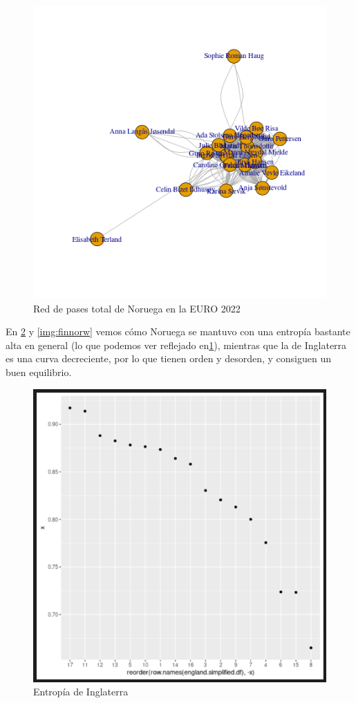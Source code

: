 \begin{figure}[h!tbp]
    \centering
     \includegraphics[width=\textwidth]{./img/plot_norw.png}
     \caption{Red de pases total de Noruega en la EURO 2022}
     \label{img:ent:norw}
\end{figure}

En \ref{img:fineng} y \ref{img:finnorw} vemos cómo Noruega se mantuvo con una entropía bastante alta en general
(lo que podemos ver reflejado en\ref{img:ent:norw}), 
mientras que la de Inglaterra es una curva decreciente, por lo que tienen orden y desorden, y consiguen un buen 
equilibrio.

\begin{figure}[h!tbp]
    \centering
     \includegraphics[width=\textwidth]{./img/englandentropy.png}
     \caption{Entropía de Inglaterra}
     \label{img:fineng}
\end{figure}

